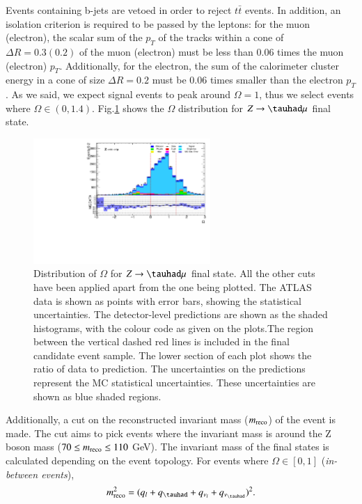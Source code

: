 Events containing b-jets are vetoed in order to reject $t\bar{t}$ events. In addition, an isolation criterion is required to be passed by the leptons: for the muon (electron), the scalar sum of the $p_T$ of the tracks within a cone of $\Delta R=0.3 (0.2)$ of the muon (electron) must be less than 0.06 times the muon (electron) $p_T$. Additionally, for the electron, the sum of the calorimeter cluster energy in a cone of size $\Delta R=0.2$ must be 0.06 times smaller than the electron $p_T$. As we said, we expect signal events to peak around $\Omega=1$, thus we select events where $\Omega\in (0,1.4)$. Fig.\ref{Fig3} shows the $\Omega$ distribution for $Z\to\tauhad\mu$ final state.
\begin{figure}[htbp]
	\centering
	\includegraphics[width=0.6\textwidth]{figures/Fig3.pdf}
	\caption{Distribution of $\Omega$ for $Z\to\tauhad\mu$ final state. All the other cuts have been applied apart from the one being plotted. The ATLAS data is shown as points with error bars, showing the statistical uncertainties. The detector-level predictions are shown as the shaded histograms, with the colour code as given on the plots.The region between the vertical dashed red lines is included in the final candidate event sample. The lower section of each plot shows the ratio of data to prediction. The uncertainties on the predictions represent the MC statistical uncertainties. These uncertainties are shown as blue shaded regions.}
	\label{Fig3}
\end{figure}
Additionally, a cut on the reconstructed invariant mass ($m_{\text{reco}}$) of the event is made. The cut aims to pick events where the invariant mass is around the Z boson mass ($70\leq m_{\text{reco}}\leq 110$ GeV). The invariant mass of the final states is calculated depending on the event topology. For events where $\Omega\in [0,1]$ (\textit{in-between events}),
\begin{equation}
\mreco^{2}=(q_l+q_{\tauhad}+q_{\nu_l}+q_{\nu_{\tauhad}})^2.
\label{eq35}
\end{equation}
